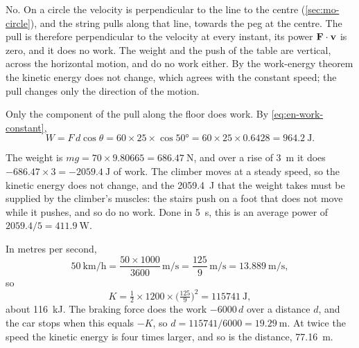\label{sec:en-solutions}

No. On a circle the velocity is perpendicular to
the line to the centre (\cref{sec:mo-circle}), and the string pulls along
that line, towards the peg at the centre. The pull is therefore
perpendicular to the velocity at every instant, its power $\bm{\mathrm{F}}\cdot
\bm{\mathrm{v}}$ is zero, and it does no work. The weight and the push of the table
are vertical, across the horizontal motion, and do no work either. By the work-energy theorem the kinetic energy does not
change, which agrees with the constant speed; the pull changes only the
direction of the motion.

Only the component of the pull along the
floor does work. By \cref{eq:en-work-constant},
\begin{equation*}
   W = F\,d\cos\theta = 60\times25\times\cos\ang{50}
   = 60\times25\times0.6428 = \SI{964.2}{\joule} .
\end{equation*}

The weight is $mg = 70\times9.80665 =
\SI{686.47}{\newton}$, and over a rise of \SI{3}{\metre} it does
$-686.47\times3 = \SI{-2059.4}{\joule}$ of work. The climber moves at a
steady speed, so the kinetic energy does not change, and the
\SI{2059.4}{\joule} that the weight takes must be supplied by the
climber's muscles: the stairs push on a foot that does not move while it
pushes, and so do no work. Done in \SI{5}{\second}, this is an average power of $2059.4/5 =
\SI{411.9}{\watt}$.

In metres per second,
\begin{equation*}
   \SI{50}{\kilo\metre\per\hour} = \frac{50\times1000}{3600}\,
   \si{\metre\per\second} = \frac{125}{9}\,\si{\metre\per\second}
   = \SI{13.889}{\metre\per\second} ,
\end{equation*}
so
\begin{equation*}
   K = \tfrac12\times1200\times\bigl(\tfrac{125}{9}\bigr)^2
   = \SI{115741}{\joule} ,
\end{equation*}
about \SI{116}{\kilo\joule}. The braking force does the work $-6000\,d$
over a distance $d$, and the car stops when this equals $-K$, so $d =
115741/6000 = \SI{19.29}{\metre}$. At twice the speed the kinetic energy
is four times larger, and so is the distance, \SI{77.16}{\metre}.

